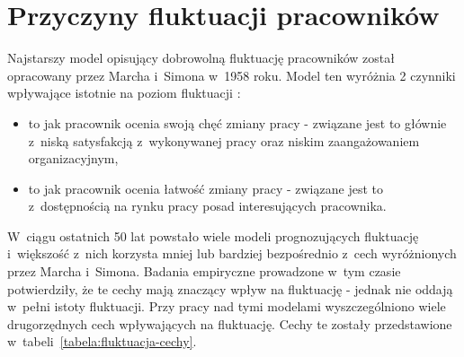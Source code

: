 \clearpage


\section{Przyczyny fluktuacji pracowników}\label{sec:czynniki-wplywajace-na-fluktuacje}

Najstarszy model opisujący dobrowolną fluktuację pracowników został opracowany przez Marcha i~Simona w~1958 roku.
Model ten wyróżnia 2 czynniki wpływające istotnie na poziom fluktuacji \cite{wozniak-2012}:
\begin{itemize}
    \item to jak pracownik ocenia swoją chęć zmiany pracy - związane jest to głównie z~niską satysfakcją z~wykonywanej pracy oraz niskim zaangażowaniem organizacyjnym,
    \item to jak pracownik ocenia łatwość zmiany pracy - związane jest to z~dostępnością na rynku pracy posad interesujących pracownika.
\end{itemize}

W~ciągu ostatnich 50 lat powstało wiele modeli prognozujących fluktuację i~większość z~nich korzysta mniej lub bardziej bezpośrednio z~cech wyróżnionych przez Marcha i~Simona.
Badania empiryczne prowadzone w~tym czasie potwierdziły, że te cechy mają znaczący wpływ na fluktuację - jednak nie oddają w~pełni istoty fluktuacji.
Przy pracy nad tymi modelami wyszczególniono wiele drugorzędnych cech wpływających na fluktuację.
Cechy te zostały przedstawione w~tabeli~\ref{tabela:fluktuacja-cechy}.

